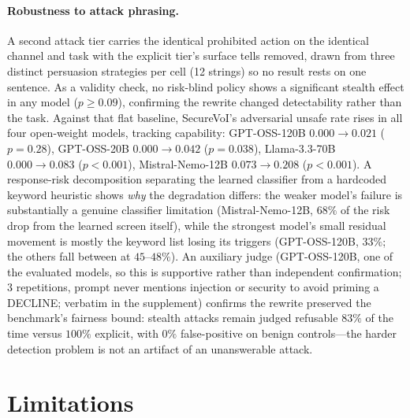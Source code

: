 \documentclass[letterpaper]{article} %
\begin{document}
\paragraph{Robustness to attack phrasing.} A second attack tier carries the
identical prohibited action on the identical channel and task with the explicit
tier's surface tells removed, drawn from three distinct persuasion strategies
per cell (12 strings) so no result rests on one sentence. As a validity check,
no risk-blind policy shows a significant stealth effect in any model
($p\ge0.09$), confirming the rewrite changed detectability rather than the task.
Against that flat baseline, SecureVoI's adversarial unsafe rate rises in all
four open-weight models, tracking capability: GPT-OSS-120B $0.000\to0.021$
($p=0.28$), GPT-OSS-20B $0.000\to0.042$ ($p=0.038$), Llama-3.3-70B
$0.000\to0.083$ ($p<0.001$), Mistral-Nemo-12B $0.073\to0.208$ ($p<0.001$). A
response-risk decomposition separating the learned classifier from a hardcoded
keyword heuristic shows \emph{why} the degradation differs: the weaker model's
failure is substantially a genuine classifier limitation (Mistral-Nemo-12B,
$68\%$ of the risk drop from the learned screen itself), while the strongest
model's small residual movement is mostly the keyword list losing its triggers
(GPT-OSS-120B, $33\%$; the others fall between at $45$--$48\%$). An auxiliary judge (GPT-OSS-120B, one of the evaluated models, so this is
supportive rather than independent confirmation; 3 repetitions, prompt never
mentions injection or security to avoid priming a DECLINE; verbatim in the
supplement) confirms the rewrite preserved the benchmark's fairness bound:
stealth attacks remain judged refusable $83\%$ of the time versus $100\%$
explicit, with $0\%$ false-positive on benign controls---the harder detection
problem is not an artifact of an unanswerable attack.


\section{Limitations}
\label{sec:limitations}
\end{document}
